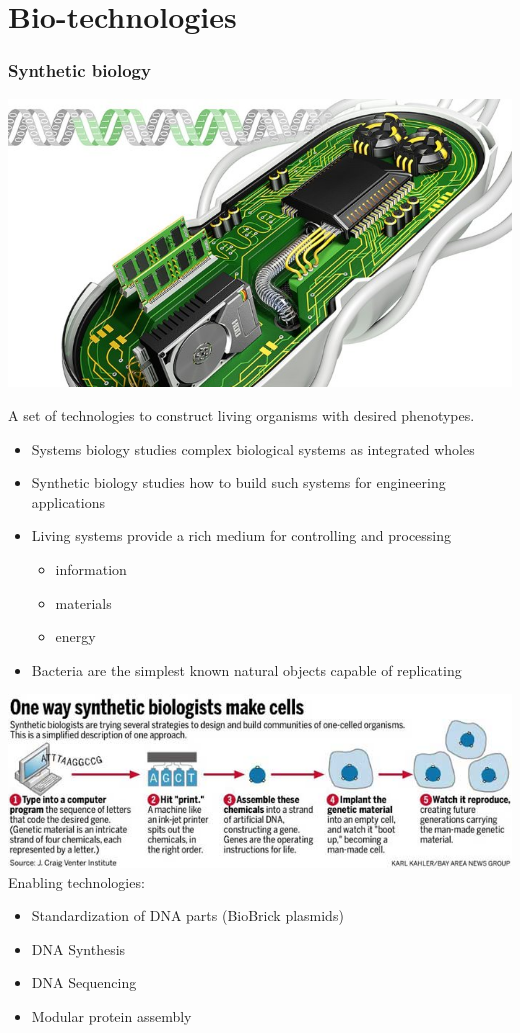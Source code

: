 \documentclass{beamer}
\begin{document}
\section{Bio-technologies}
\begin{frame}
	\frametitle{Synthetic biology}
	\begin{center}
		\includegraphics[scale=.4]{SynBio_main}
	\end{center}
	A set of technologies to construct living organisms with desired phenotypes. 
\end{frame}
\begin{frame}
		\begin{itemize}
		\item Systems biology studies complex biological systems as integrated wholes
		\item Synthetic biology studies how to build such systems for engineering applications
		\item Living systems provide a rich medium for controlling and processing
			\begin{itemize}
				\item information
				\item materials
				\item energy
			\end{itemize}
		\item Bacteria are the simplest known natural objects capable of replicating
	\end{itemize}
\end{frame}
\begin{frame}
	\includegraphics[scale=.5]{cell_synthesis}
	\\
	Enabling technologies:
	\begin{itemize}
		\item Standardization of DNA parts (BioBrick plasmids)
		\item DNA Synthesis
		\item DNA Sequencing
		\item Modular protein assembly
	\end{itemize}
\end{frame}
\end{document}
